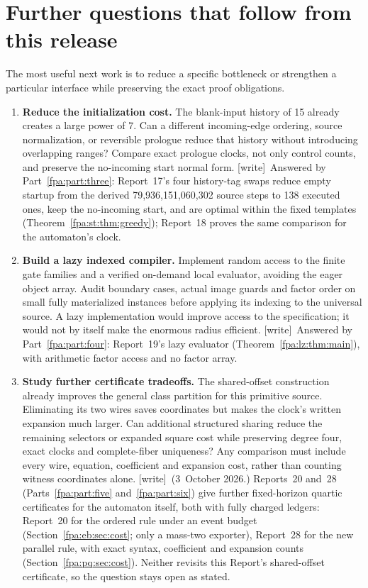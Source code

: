 \documentclass[11pt,a4paper]{article}
\numberwithin{equation}{section}
\newcommand{\wtag}{\textup{[write]}}
\begin{document}
\section{Further questions that follow from this release}\label{fpa:rep:16:last}
The most useful next work is to reduce a specific bottleneck or strengthen a
particular interface while preserving the exact proof obligations.
\begin{enumerate}
\item \textbf{Reduce the initialization cost.} The blank-input history of 15
already creates a large power of 7. Can a different incoming-edge ordering,
source normalization, or reversible prologue reduce that history without
introducing overlapping ranges? Compare exact prologue clocks, not only
control counts, and preserve the no-incoming start normal form.
\wtag\ Answered by Part~\ref{fpa:part:three}: Report~17's four history-tag swaps reduce empty startup from the derived 79,936,151,060,302 source steps to 138 executed ones, keep the no-incoming start, and are optimal within the fixed templates (Theorem~\ref{fpa:st:thm:greedy}); Report~18 proves the same comparison for the automaton's clock.

\item \textbf{Build a lazy indexed compiler.} Implement random access to the
finite gate families and a verified on-demand local evaluator, avoiding the
eager object array. Audit boundary cases, actual image guards and factor
order on small fully materialized instances before applying its indexing to
the universal source. A lazy implementation would improve access to the
specification; it would not by itself make the enormous radius efficient.
\wtag\ Answered by Part~\ref{fpa:part:four}: Report~19's lazy evaluator (Theorem~\ref{fpa:lz:thm:main}), with arithmetic factor access and no factor array.

\item \textbf{Study further certificate tradeoffs.}
The shared-offset construction already improves the general class partition
for this primitive source. Eliminating its two wires saves coordinates but
makes the clock's written expansion much larger. Can additional structured
sharing reduce the remaining selectors or expanded square cost while
preserving degree four, exact clocks and complete-fiber uniqueness? Any
comparison must include every wire, equation, coefficient and expansion
cost, rather than counting witness coordinates alone.
\wtag\ (3~October 2026.) Reports~20 and~28 (Parts~\ref{fpa:part:five} and~\ref{fpa:part:six}) give further fixed-horizon quartic certificates for the automaton itself, both with fully charged ledgers: Report~20 for the ordered rule under an event budget (Section~\ref{fpa:eb:sec:cost}; only a mass-two exporter), Report~28 for the new parallel rule, with exact syntax, coefficient and expansion counts (Section~\ref{fpa:pq:sec:cost}). Neither revisits this Report's shared-offset certificate, so the question stays open as stated.


\end{enumerate}
\end{document}
